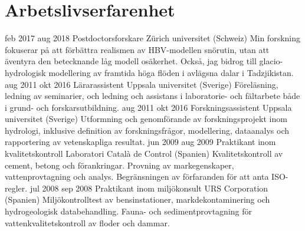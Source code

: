 \ifswedish
  \section{Arbetslivserfarenhet}
    \position
      {feb 2017 \textemdash{} aug 2018}
      {Postdoctorsforskare}
      {Zürich universitet (Schweiz)}
      {Min forskning fokuserar på att förbättra realismen av HBV-modellen snörutin, utan att äventyra den betecknande låg modell osäkerhet. Också, jag bidrog till glacio-hydrologisk modellering av framtida höga flöden i avlägsna dalar i Tadzjikistan.}
    \position
      {aug 2011 \textemdash{} okt 2016}
      {Lärarassistent}
      {Uppsala universitet (Sverige)}
      {Föreläsning, ledning av seminarier, och ledning och assistans i laboratorie- och fältarbete både i grund- och forskarsutbildning.}
    \position
      {aug 2011 \textemdash{} okt 2016}
      {Forskningsassistent}
      {Uppsala universitet (Sverige)}
      {Utformning och genomförande av forskningsprojekt inom hydrologi, inklusive definition av forskningsfrågor, modellering, dataanalys och rapportering av vetenskapliga resultat.}
    \position
      {jun 2009 \textemdash{} aug 2009}
      {Praktikant inom kvalitetskontroll}
      {Laboratori Català de Control (Spanien)}
      {Kvalitetskontroll av cement, betong och förankringar. Provning av markegenskaper, vattenprovtagning och analys. Begränsningen av förfaranden för att anta ISO-regler.}
    \position
      {jul 2008 \textemdash{} sep 2008}
      {Praktikant inom miljökonsult}
      {URS Corporation (Spanien)}
      {Miljökontrolltest av bensinstationer, markdekontaminering och hydrogeologisk databehandling. Fauna- och sedimentprovtagning för vattenkvalitetskontroll av floder och dammar.}
\else
